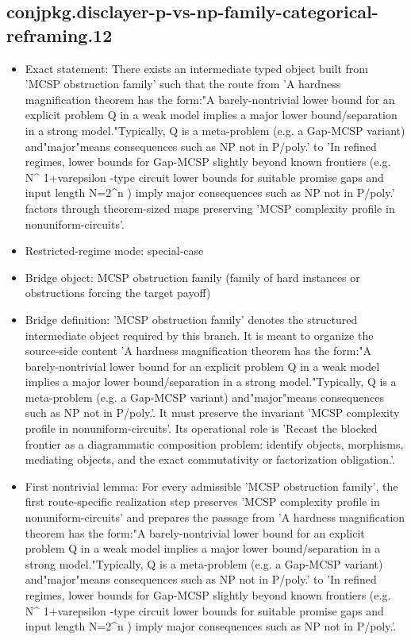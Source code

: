\documentclass[11pt]{article}
\begin{document}
\subsection*{conjpkg.disclayer-p-vs-np-family-categorical-reframing.12}
\begin{itemize}
\item Exact statement: There exists an intermediate typed object built from 'MCSP obstruction family' such that the route from 'A hardness magnification theorem has the form:"A barely-nontrivial lower bound for an explicit problem Q in a weak model implies a major lower bound/separation in a strong model."Typically, Q is a meta-problem (e.g. a Gap-MCSP variant) and"major"means consequences such as NP not in P/poly.' to 'In refined regimes, lower bounds for Gap-MCSP slightly beyond known frontiers (e.g. N\textasciicircum{} 1+varepsilon -type circuit lower bounds for suitable promise gaps and input length N=2\textasciicircum{}n ) imply major consequences such as NP not in P/poly.' factors through theorem-sized maps preserving 'MCSP complexity profile in nonuniform-circuits'.
\item Restricted-regime mode: special-case
\item Bridge object: MCSP obstruction family (family of hard instances or obstructions forcing the target payoff)
\item Bridge definition: 'MCSP obstruction family' denotes the structured intermediate object required by this branch. It is meant to organize the source-side content 'A hardness magnification theorem has the form:"A barely-nontrivial lower bound for an explicit problem Q in a weak model implies a major lower bound/separation in a strong model."Typically, Q is a meta-problem (e.g. a Gap-MCSP variant) and"major"means consequences such as NP not in P/poly.'. It must preserve the invariant 'MCSP complexity profile in nonuniform-circuits'. Its operational role is 'Recast the blocked frontier as a diagrammatic composition problem: identify objects, morphisms, mediating objects, and the exact commutativity or factorization obligation.'.
\item First nontrivial lemma: For every admissible 'MCSP obstruction family', the first route-specific realization step preserves 'MCSP complexity profile in nonuniform-circuits' and prepares the passage from 'A hardness magnification theorem has the form:"A barely-nontrivial lower bound for an explicit problem Q in a weak model implies a major lower bound/separation in a strong model."Typically, Q is a meta-problem (e.g. a Gap-MCSP variant) and"major"means consequences such as NP not in P/poly.' to 'In refined regimes, lower bounds for Gap-MCSP slightly beyond known frontiers (e.g. N\textasciicircum{} 1+varepsilon -type circuit lower bounds for suitable promise gaps and input length N=2\textasciicircum{}n ) imply major consequences such as NP not in P/poly.'.

\end{itemize}
\end{document}
